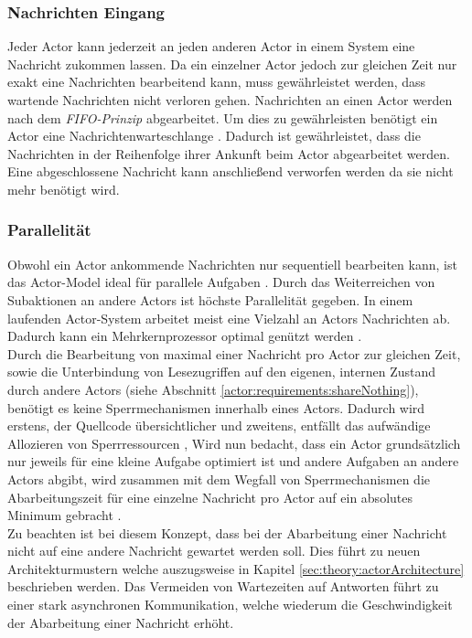 \subsubsection{Nachrichten Eingang}\label{actor:Mailbox}
Jeder Actor kann jederzeit an jeden anderen Actor in einem System eine Nachricht zukommen lassen. Da ein einzelner Actor jedoch zur gleichen Zeit nur exakt eine Nachrichten bearbeitend kann, muss gewährleistet werden, dass wartende Nachrichten nicht verloren gehen. Nachrichten an einen Actor werden nach dem \textit{FIFO-Prinzip} abgearbeitet. 
Um dies zu gewährleisten benötigt ein Actor eine Nachrichtenwarteschlange \citep{Agha1985ActorsSystems}. Dadurch ist gewährleistet, dass die Nachrichten in der Reihenfolge ihrer Ankunft beim Actor abgearbeitet werden. Eine abgeschlossene Nachricht kann anschließend verworfen werden da sie nicht mehr benötigt wird. 

\subsubsection{Parallelität}\label{actor:parallelism}
Obwohl ein Actor ankommende Nachrichten nur sequentiell bearbeiten kann, ist das Actor-Model ideal für parallele Aufgaben \citep{hewitt1973session}. Durch das Weiterreichen von Subaktionen an andere Actors ist höchste Parallelität gegeben. In einem laufenden Actor-System arbeitet meist eine Vielzahl an Actors Nachrichten ab. Dadurch kann ein Mehrkernprozessor optimal genützt werden \citep{Agha1985ActorsSystems}. \\ 
Durch die Bearbeitung von maximal einer Nachricht pro Actor zur gleichen Zeit, sowie die Unterbindung von Lesezugriffen auf den eigenen, internen Zustand durch andere Actors (siehe Abschnitt \ref{actor:requirements:shareNothing}), benötigt es keine Sperrmechanismen innerhalb eines Actors. Dadurch wird erstens, der Quellcode übersichtlicher und zweitens, entfällt das aufwändige Allozieren von Sperrressourcen \citep{Vernon2015ReactiveAkka},
Wird nun bedacht, dass ein Actor grundsätzlich nur jeweils für eine kleine Aufgabe optimiert ist und andere Aufgaben an andere Actors abgibt, wird zusammen mit dem Wegfall von Sperrmechanismen die Abarbeitungszeit für eine einzelne Nachricht pro Actor auf ein absolutes Minimum gebracht \citep{Vernon2015ReactiveAkka}. \\
Zu beachten ist bei diesem Konzept, dass bei der Abarbeitung einer Nachricht nicht auf eine andere Nachricht gewartet werden soll. Dies führt zu neuen Architekturmustern welche auszugsweise in Kapitel \ref{sec:theory:actorArchitecture} beschrieben werden. Das Vermeiden von Wartezeiten auf Antworten führt zu einer stark asynchronen Kommunikation, welche wiederum die Geschwindigkeit der Abarbeitung einer Nachricht erhöht.

